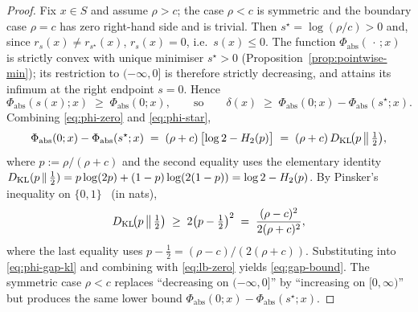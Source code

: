 \begin{proof}
Fix $x\in S$ and assume $\rho>c$; the case $\rho<c$ is symmetric and
the boundary case $\rho=c$ has zero right-hand side and is trivial.
Then $s^\star=\log(\rho/c)>0$ and, since $r_s(x)\neq r_{s^\star}(x)$,
$r_s(x)=0$, i.e.\ $s(x)\leq 0$. The function
$\Phi_{\mathrm{abs}}(\,\cdot\,;x)$ is strictly convex with unique
minimiser $s^\star>0$ (Proposition~\ref{prop:pointwise-min}); its
restriction to $(-\infty,0]$ is therefore strictly decreasing, and
attains its infimum at the right endpoint $s=0$. Hence
\begin{equation}
  \Phi_{\mathrm{abs}}(s(x);x)\;\geq\;\Phi_{\mathrm{abs}}(0;x),
  \qquad\text{so}\qquad
  \delta(x)\;\geq\;\Phi_{\mathrm{abs}}(0;x)-\Phi_{\mathrm{abs}}(s^\star;x).
  \label{eq:lb-zero}
\end{equation}
Combining \eqref{eq:phi-zero} and \eqref{eq:phi-star},
\begin{equation}
  \Phi_{\mathrm{abs}}(0;x)-\Phi_{\mathrm{abs}}(s^\star;x)
  \;=\;(\rho+c)\,\bigl[\log 2-H_2(p)\bigr]
  \;=\;(\rho+c)\,D_{\mathrm{KL}}\!\bigl(p\,\big\|\,\tfrac{1}{2}\bigr),
  \label{eq:phi-gap-kl}
\end{equation}
where $p:=\rho/(\rho+c)$ and the second equality uses the elementary
identity $D_{\mathrm{KL}}(p\,\|\,\tfrac{1}{2})=p\log(2p)+(1-p)\log(2(1-p))=\log
2-H_2(p)$. By Pinsker's inequality on
$\{0,1\}$~\citep{csiszar1967information} (in nats),
\[
  D_{\mathrm{KL}}\!\bigl(p\,\big\|\,\tfrac{1}{2}\bigr)\;\geq\;2\bigl(p-\tfrac{1}{2}\bigr)^2
  \;=\;\frac{(\rho-c)^2}{2(\rho+c)^2},
\]
where the last equality uses $p-\tfrac{1}{2}=(\rho-c)/(2(\rho+c))$.
Substituting into \eqref{eq:phi-gap-kl} and combining with
\eqref{eq:lb-zero} yields \eqref{eq:gap-bound}. The symmetric case
$\rho<c$ replaces ``decreasing on $(-\infty,0]$'' by ``increasing on
$[0,\infty)$'' but produces the same lower bound
$\Phi_{\mathrm{abs}}(0;x)-\Phi_{\mathrm{abs}}(s^\star;x)$.
\end{proof}

